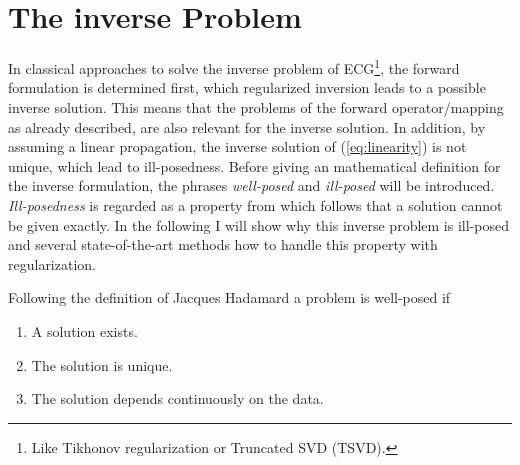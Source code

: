




\section{The inverse Problem}
In classical approaches to solve the inverse problem of ECG\footnote{Like Tikhonov regularization or Truncated SVD (TSVD)\cite{macfarlane_comprehensive_2010_page_309}.}, the forward formulation is determined first, which regularized inversion leads to a possible inverse solution. This means that the problems of the forward operator/mapping as already described, are also relevant for the inverse solution. In addition, by assuming a linear propagation, the inverse solution of (\ref{eq:linearity}) is not unique, which lead to ill-posedness.
Before giving an mathematical definition for the inverse formulation, the phrases \textit{well-posed} and \textit{ill-posed} will be introduced.  \textit{Ill-posedness} is regarded as a property from which follows that a solution cannot be given exactly. 
In the following I will show why this inverse problem is ill-posed and several state-of-the-art methods how to handle this property with regularization.

Following the definition of Jacques Hadamard \cite{hadamard_1902} a problem is well-posed if

\begin{enumerate} 
    \item A solution exists.
    \item The solution is unique.
    \item The solution depends continuously on the data.
\end{enumerate}

